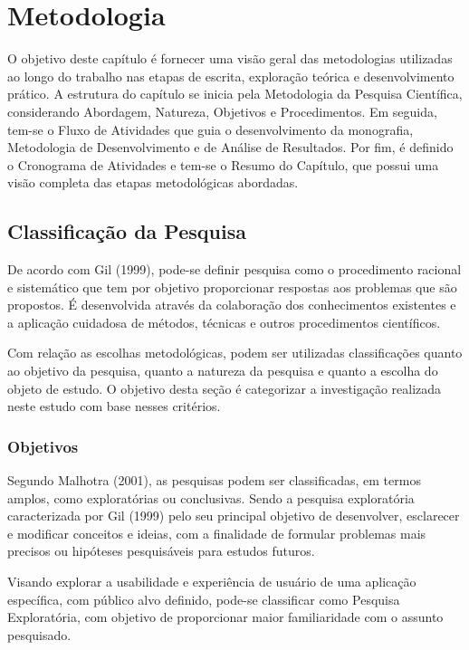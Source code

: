 \chapter[Metodologia]{Metodologia}
O objetivo deste capítulo é fornecer uma visão geral das metodologias utilizadas ao longo do trabalho nas etapas de escrita, exploração teórica e desenvolvimento prático. 
A estrutura do capítulo se inicia pela Metodologia da Pesquisa Científica, considerando Abordagem, Natureza, Objetivos e Procedimentos. Em seguida, tem-se o Fluxo de Atividades que guia o desenvolvimento  
da monografia, Metodologia de Desenvolvimento e de Análise de Resultados. Por fim, é definido o Cronograma de Atividades e tem-se o Resumo do Capítulo, que possui uma visão completa das etapas 
metodológicas abordadas.

\section{Classificação da Pesquisa}
\label{sec:Classificação da Pesquisa}
De acordo com Gil (1999), pode-se definir pesquisa como o procedimento racional e sistemático que tem por objetivo proporcionar respostas aos problemas que são propostos. É desenvolvida através da colaboração 
dos conhecimentos existentes e a aplicação cuidadosa de métodos, técnicas e outros procedimentos científicos.

Com relação as escolhas metodológicas, podem ser utilizadas classificações quanto ao objetivo da pesquisa, quanto a natureza da pesquisa e quanto a escolha do objeto de estudo. O objetivo desta seção é 
categorizar a investigação realizada neste estudo com base nesses critérios.

\subsection{Objetivos}
\label{sec:Objetivos2}
Segundo Malhotra (2001), as pesquisas podem ser classificadas, em termos amplos, como exploratórias ou conclusivas. Sendo a pesquisa exploratória caracterizada por Gil (1999) pelo seu principal objetivo de 
desenvolver, esclarecer e modificar conceitos e ideias, com a finalidade de formular problemas mais precisos ou hipóteses pesquisáveis para estudos futuros.

Visando explorar a usabilidade e experiência de usuário de uma aplicação específica, com público alvo definido, pode-se classificar como Pesquisa Exploratória, com objetivo de proporcionar maior familiaridade 
com o assunto pesquisado.